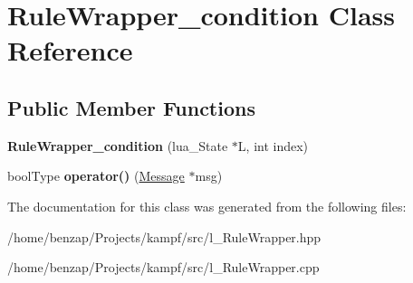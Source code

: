 \hypertarget{classRuleWrapper__condition}{\section{Rule\-Wrapper\-\_\-condition Class Reference}
\label{classRuleWrapper__condition}
}
\subsection*{Public Member Functions}
\begin{DoxyCompactItemize}
\item 
\hypertarget{classRuleWrapper__condition_a8efbbceac24b5d0bd5aacc41048276c5}{{\bfseries Rule\-Wrapper\-\_\-condition} (lua\-\_\-\-State $\ast$L, int index)}\label{classRuleWrapper__condition_a8efbbceac24b5d0bd5aacc41048276c5}

\item 
\hypertarget{classRuleWrapper__condition_a1da7f379f7888075daf789b4d5296ed9}{bool\-Type {\bfseries operator()} (\hyperlink{classMessage}{Message} $\ast$msg)}\label{classRuleWrapper__condition_a1da7f379f7888075daf789b4d5296ed9}

\end{DoxyCompactItemize}


The documentation for this class was generated from the following files\-:\begin{DoxyCompactItemize}
\item 
/home/benzap/\-Projects/kampf/src/l\-\_\-\-Rule\-Wrapper.\-hpp\item 
/home/benzap/\-Projects/kampf/src/l\-\_\-\-Rule\-Wrapper.\-cpp\end{DoxyCompactItemize}
